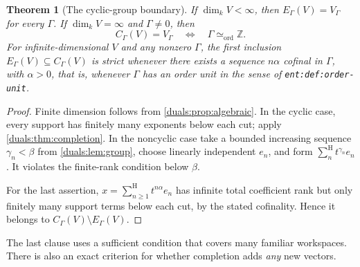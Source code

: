 \documentclass[11pt,letterpaper]{article}
\numberwithin{equation}{section}
\newtheorem{theorem}{Theorem}[section]
\theoremstyle{definition}
\theoremstyle{remark}
\newcommand{\Z}{\mathbb Z}
\newcommand{\sH}{\mathop{\sum}\nolimits^{\mathrm H}}
\newcommand{\cyc}{\Gamma\simeq_{\mathrm{ord}}\Z}
\newcommand{\lab}[1]{\texttt{#1}}
\begin{document}
\begin{theorem}[The cyclic-group boundary]\label{duals:thm:cyclic}
If $\dim_kV<\infty$, then $E_\Gamma(V)=V_\Gamma$ for every $\Gamma$.
If $\dim_kV=\infty$ and $\Gamma\ne0$, then
\[
 C_\Gamma(V)=V_\Gamma\quad\Longleftrightarrow\quad\cyc.
\]
For infinite-dimensional $V$ and any nonzero $\Gamma$, the first
inclusion $E_\Gamma(V)\subseteq C_\Gamma(V)$ is strict whenever there
exists a sequence $n\alpha$ cofinal in $\Gamma$, with $\alpha>0$, that is,
whenever $\Gamma$ has an order unit in the sense of \lab{ent:def:order-unit}.
\end{theorem}
\begin{proof}
Finite dimension follows from \cref{duals:prop:algebraic}. In the cyclic case,
every support has finitely many exponents below each cut; apply
\cref{duals:thm:completion}. In the noncyclic case take a bounded increasing
sequence $\gamma_n<\beta$ from \cref{duals:lem:group}, choose linearly
independent $e_n$, and form $\sH_n t^{\gamma_n}e_n$.
It violates the finite-rank condition below $\beta$.

For the last assertion, $x=\sH_{n\ge1}t^{n\alpha}e_n$ has infinite
total coefficient rank but only finitely many support terms below each
cut, by the stated cofinality. Hence it belongs to
$C_\Gamma(V)\setminus E_\Gamma(V)$.
\end{proof}

The last clause uses a sufficient condition that covers many familiar
workspaces. There is also an exact criterion for whether completion adds
\emph{any} new vectors.
\end{document}
